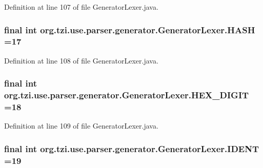 Definition at line 107 of file Generator\-Lexer.\-java.

\hypertarget{classorg_1_1tzi_1_1use_1_1parser_1_1generator_1_1_generator_lexer_a76c36378aa52cdfd3396cd191a38c12f}{
\subsubsection[{H\-A\-S\-H}]{\setlength{\rightskip}{0pt plus 5cm}final int org.\-tzi.\-use.\-parser.\-generator.\-Generator\-Lexer.\-H\-A\-S\-H =17\hspace{0.3cm}{\ttfamily [static]}}}\label{classorg_1_1tzi_1_1use_1_1parser_1_1generator_1_1_generator_lexer_a76c36378aa52cdfd3396cd191a38c12f}


Definition at line 108 of file Generator\-Lexer.\-java.

\hypertarget{classorg_1_1tzi_1_1use_1_1parser_1_1generator_1_1_generator_lexer_a6c15ee6845c6fe8ca453982480e18545}{
\subsubsection[{H\-E\-X\-\_\-\-D\-I\-G\-I\-T}]{\setlength{\rightskip}{0pt plus 5cm}final int org.\-tzi.\-use.\-parser.\-generator.\-Generator\-Lexer.\-H\-E\-X\-\_\-\-D\-I\-G\-I\-T =18\hspace{0.3cm}{\ttfamily [static]}}}\label{classorg_1_1tzi_1_1use_1_1parser_1_1generator_1_1_generator_lexer_a6c15ee6845c6fe8ca453982480e18545}


Definition at line 109 of file Generator\-Lexer.\-java.

\hypertarget{classorg_1_1tzi_1_1use_1_1parser_1_1generator_1_1_generator_lexer_a1b2d6a21204118ef186ca34389f9fd70}{
\subsubsection[{I\-D\-E\-N\-T}]{\setlength{\rightskip}{0pt plus 5cm}final int org.\-tzi.\-use.\-parser.\-generator.\-Generator\-Lexer.\-I\-D\-E\-N\-T =19\hspace{0.3cm}{\ttfamily [static]}}}\label{classorg_1_1tzi_1_1use_1_1parser_1_1generator_1_1_generator_lexer_a1b2d6a21204118ef186ca34389f9fd70}


